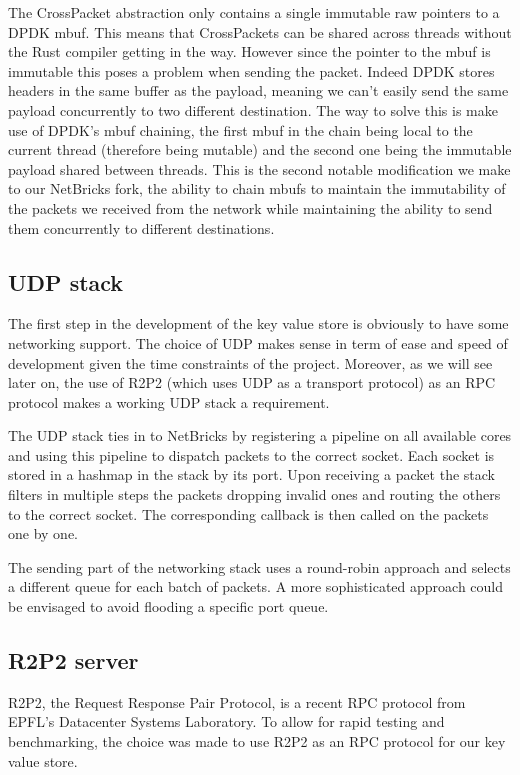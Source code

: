 \documentclass[11pt]{article}
\begin{document}
The CrossPacket abstraction only contains a single immutable raw
pointers to a DPDK mbuf. This means that CrossPackets can be shared
across threads without the Rust compiler getting in the way. However
since the pointer to the mbuf is immutable this poses a problem when
sending the packet. Indeed DPDK stores headers in the same buffer as
the payload, meaning we can't easily send the same payload
concurrently to two different destination. The way to solve this is
make use of DPDK's mbuf chaining, the first mbuf in the chain being
local to the current thread (therefore being mutable) and the second
one being the immutable payload shared between threads. This is the
second notable modification we make to our NetBricks fork, the ability
to chain mbufs to maintain the immutability of the packets we received
from the network while maintaining the ability to send them
concurrently to different destinations.


\subsection{UDP stack}
The first step in the development of the key value store is obviously
to have some networking support. The choice of UDP makes sense in term
of ease and speed of development given the time constraints of the
project. Moreover, as we will see later on, the use of R2P2 (which
uses UDP as a transport protocol) as an RPC protocol makes a
working UDP stack a requirement.

The UDP stack ties in to NetBricks by registering a pipeline on all
available cores and using this pipeline to dispatch packets to the
correct socket. Each socket is stored in a hashmap in the stack by its
port. Upon receiving a packet the stack filters in multiple steps the
packets dropping invalid ones and routing the others to the correct
socket. The corresponding callback is then called on the packets one
by one.

The sending part of the networking stack uses a round-robin approach
and selects a different queue for each batch of packets. A more
sophisticated approach could be envisaged to avoid flooding a specific
port queue.

\subsection{R2P2 server}
R2P2, the Request Response Pair Protocol, is a recent RPC protocol
from EPFL's Datacenter Systems Laboratory. To allow for rapid testing
and benchmarking, the choice was made to use R2P2 as an RPC protocol
for our key value store.
\end{document}
